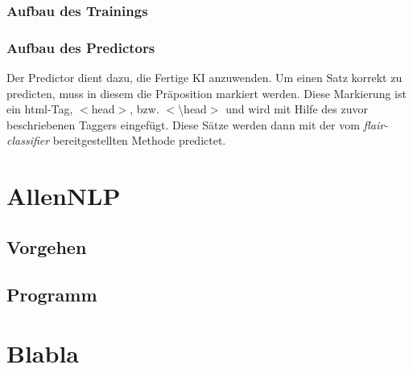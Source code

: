 \documentclass[10pt,a4paper]{article}
\begin{document}
\subsubsection{Aufbau des Trainings}
\begin{flushleft}

\end{flushleft}

\subsubsection{Aufbau des Predictors}
\begin{flushleft}
Der Predictor dient dazu, die Fertige KI anzuwenden. Um einen Satz korrekt zu predicten, muss in diesem die Präposition markiert werden. Diese Markierung ist ein html-Tag, $<$head$>$, bzw. $<$\textbackslash head$>$ und wird mit Hilfe des zuvor beschriebenen Taggers eingefügt. Diese Sätze werden dann mit der vom \textit{flair-classifier} bereitgestellten Methode predictet.
\end{flushleft}

\newpage

\section{AllenNLP}

\subsection{Vorgehen}

\subsection{Programm}

\newpage

\section{Blabla}
\end{document}
